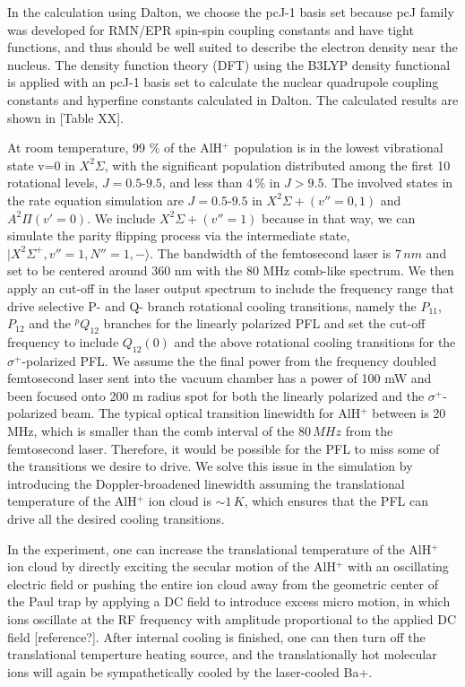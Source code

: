 \documentclass[aip,jcp,reprint]{revtex4-1}
\begin{document}
 In the calculation using Dalton, we choose the pcJ-1 basis set because pcJ family was developed for RMN/EPR spin-spin coupling constants and have tight functions, and thus should be well suited to describe the electron density near the nucleus. The density function theory (DFT) using the B3LYP density functional is applied with an pcJ-1 basis set to calculate the nuclear quadrupole coupling constants and hyperfine constants calculated in Dalton. The calculated results are shown in [Table XX].

At room temperature, 99 $\%$ of the AlH$^+$ population is in the lowest vibrational state v=0 in $X^2 \Sigma$, with the significant population distributed among the first 10 rotational levels, $J=0.5$-$9.5$, and less than $4\, \%$ in $J>9.5$.
The involved states in the rate equation simulation are  $J=0.5$-$9.5$ in $X^2\Sigma+ (v''=0,1)$ and $A^2\Pi (v'=0)$. We include $X^2\Sigma+ (v''=1)$ because in that way, we can simulate the parity flipping process via the intermediate state, $\lvert X^2\Sigma^+, v''=1, N''=1, -\rangle$. 
The bandwidth of the femtosecond laser is $7\, nm$ and set to be centered around 360 nm with the 80 MHz comb-like spectrum. We then apply an cut-off in the laser output spectrum to include the frequency range that drive selective P- and Q- branch rotational cooling transitions, namely the $P_{11}$, $P_{12}$ and the $^pQ_{12}$ branches for the linearly polarized PFL and set the cut-off frequency to include $Q_{12}(0)$ and the above rotational cooling transitions for the $\sigma^+$-polarized PFL. We assume the the final power from the frequency doubled femtosecond laser sent into the vacuum chamber has a power of 100 mW and been focused onto 200 {\micro}m radius spot for both the linearly polarized and the $\sigma^+$-polarized beam. 
The typical optical transition linewidth for AlH$^+$ between is 20 MHz, which is smaller than the comb interval of the $80\, MHz$ from the femtosecond laser. Therefore, it would be possible for the PFL to miss some of the transitions we desire to drive.
We solve this issue in the simulation by introducing the Doppler-broadened linewidth assuming the translational temperature of the AlH$^+$ ion cloud is $\sim 1\, K$, which ensures that the PFL can drive all the desired cooling transitions.  

In the experiment, one can increase the translational temperature of the AlH$^+$ ion cloud by directly exciting the secular motion of the AlH$^+$ with an oscillating electric field or pushing the entire ion cloud away from the geometric center of the Paul trap by applying a DC field to introduce excess micro motion, in which ions oscillate at the RF frequency with amplitude proportional to the applied DC field [reference?]. After internal cooling is finished, one can then turn off the translational temperture heating source, and the translationally hot molecular ions will again be sympathetically cooled by the laser-cooled Ba+.
\end{document}
